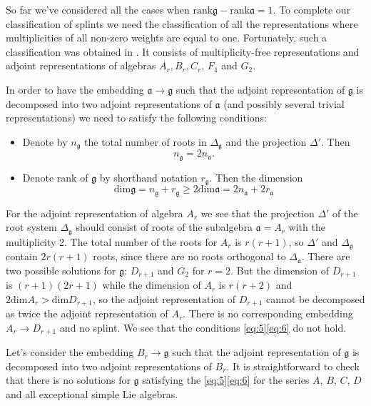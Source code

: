 \documentclass[12pt]{iopart}
\newcommand{\gf}{\mathfrak{g}}
\newcommand{\af}{\mathfrak{a}}
\begin{document}
So far we've considered all the cases when $\mathrm{rank}\gf-\mathrm{rank}\af=1$. To complete our
classification of splints we need the classification of all the representations where multiplicities
of all non-zero weights are equal to one. Fortunately, such a classification was obtained in
\cite{plotkin1998visual}. It consists of multiplicity-free representations and adjoint
representations of algebras $A_{r}, B_{r}, C_{r}$, $F_{4}$ and $G_{2}$. 

In order to have the embedding $\af\to \gf$ such that the adjoint representation of $\gf$ is
decomposed into two adjoint representations of $\af$ (and possibly several trivial
representations) we need to satisfy the following conditions:
\begin{itemize}
\item Denote by $n_{\gf}$ the total number of roots in $\Delta_{\gf}$ and the projection $\Delta'$.
  Then
  \begin{equation}
    \label{eq:5}
    n_{\gf}=2n_{\af}.
  \end{equation}
\item Denote rank of $\gf$ by shorthand notation $r_{\gf}$. Then the dimension
  \begin{equation}
    \label{eq:6}
    \mathrm{dim}\gf=n_{\gf}+r_{\gf}\geq 2\mathrm{dim}\af=2n_{\af}+2r_{\af}
  \end{equation}

\end{itemize}


For the adjoint representation of algebra $A_{r}$ we see that the projection $\Delta'$ of the root system
$\Delta_{\gf}$ should consist of roots of the subalgebra $\af=A_{r}$ with the multiplicity 2. The total
number of the roots for $A_{r}$ is $r(r+1)$, so $\Delta'$ and $\Delta_{\gf}$ contain $2r(r+1)$ roots,
since there are no roots orthogonal to $\Delta_{\af}$. There are two possible solutions for
$\gf$: $D_{r+1}$ and $G_{2}$ for $r=2$. But the dimension of $D_{r+1}$ is $(r+1)(2r+1)$ while the
dimension of $A_{r}$ is $r(r+2)$ and $2\mathrm{dim}A_{r}>\mathrm{dim}D_{r+1}$, so the adjoint
representation of $D_{r+1}$ cannot be decomposed as twice the adjoint representation of $A_{r}$.
There is no corresponding embedding $A_{r}\to D_{r+1}$ and no splint. We see that the conditions
\ref{eq:5}\ref{eq:6} do not hold. 

Let's consider the embedding $B_{r}\to \gf$ such that the adjoint representation of $\gf$ is
decomposed into two adjoint representations of $B_{r}$. It is straightforward to check that there is
no solutions for $\gf$ satisfying the \ref{eq:5}\ref{eq:6} for the series $A$, $B$, $C$,
$D$ and all exceptional simple Lie algebras. 
\end{document}
